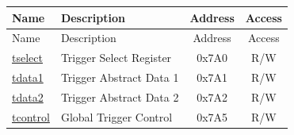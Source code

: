 
\begin{longtable}{ | p{4.0cm} | p{8.4cm} | c | c| }
\hline\rowcolor{lightgray}
Name & Description & Address & Access \\ \hline
\endfirsthead
\hline
\rowcolor{lightgray}
Name & Description & Address & Access  \\
\hline
\endhead
\endfoot

\hyperref[regdesc:TSELECT]{tselect} & Trigger Select Register & 0x7A0 & R/W \\\hline
\hyperref[regdesc:TDATA1]{tdata1} & Trigger Abstract Data 1 & 0x7A1 & R/W \\\hline
\hyperref[regdesc:TDATA2]{tdata2} & Trigger Abstract Data 2 & 0x7A2 & R/W \\\hline
\hyperref[regdesc:TCONTROL]{tcontrol} & Global Trigger Control & 0x7A5 & R/W \\\hline

\end{longtable}